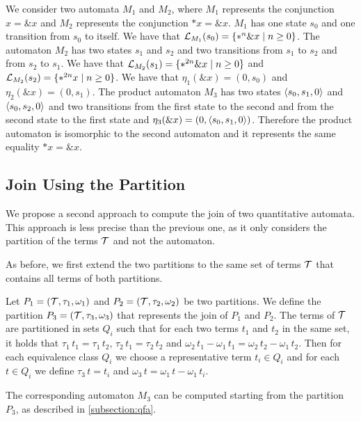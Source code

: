 \begin{example}\label{example:join-subset}
    We consider two automata $M_1$ and $M_2$, where $M_1$ represents the conjunction $x = \&x$ and $M_2$ represents the conjunction $*x = \&x$.
    $M_1$ has one state $s_0$ and one transition from $s_0$ to itself. We have that $\mathcal{L}_{M_1}(s_0) =\{*^n\&x\mid n \geq 0\}$.
    The automaton $M_2$ has two states $s_1$ and $s_2$ and two transitions from $s_1$ to $s_2$ and from $s_2$ to $s_1$. We have that $\mathcal{L}_{M_2}(s_1) = \{*^{2n}\&x\mid n \geq 0\}$ and $\mathcal{L}_{M_2}(s_2) = \{*^{2n}x\mid n \geq 0\}$.
    We have that $\eta_1(\&x) = (0, s_0)$ and $\eta_2 (\&x) = (0, s_1)$.
    The product automaton $M_3$ has two states $\langle s_0, s_1, 0\rangle$ and $\langle s_0, s_2, 0\rangle$ and two transitions from the first state to the second and from the second state to the first state and $\eta_3(\&x) = (0, \langle s_0, s_1, 0\rangle)$.
    Therefore the product automaton is isomorphic to the second automaton and it represents the same equality $*x = \&x$.
\end{example}

\subsection{Join Using the Partition}\label{subsection:join-partition}

We propose a second approach to compute the join of two quantitative automata.
This approach is less precise than the previous one, as it only considers the partition of the terms $\mathcal{T}$ and not the automaton.

As before, we first extend the two partitions to the same set of terms $\mathcal{T}$ that contains all terms of both partitions.

Let $P_1 = (\mathcal{T}, \tau_1, \omega_1)$ and $P_2 = (\mathcal{T}, \tau_2, \omega_2)$ be two partitions.
We define the partition $P_3 = (\mathcal{T}, \tau_3, \omega_3)$ that represents the join of $P_1$ and $P_2$.
The terms of $\mathcal{T}$ are partitioned in sets $Q_i$ such that for each two terms $t_1$ and $t_2$ in the same set, it holds that $\tau_1\,t_1 = \tau_1\,t_2$, $\tau_2\,t_1 = \tau_2\,t_2$ and $\omega_2\,t_1 -\omega_1\,t_1 = \omega_2\,t_2 - \omega_1\,t_2$.
Then for each equivalence class $Q_i$ we choose a representative term $t_i\in Q_i$ and
for each $t \in Q_i$ we define $\tau_3\,t = t_i$ and $\omega_3\,t = \omega_1\,t - \omega_1\,t_i$.

The corresponding automaton $M_3$ can be computed starting from the partition $P_3$,
as described in \cref{subsection:qfa}.

